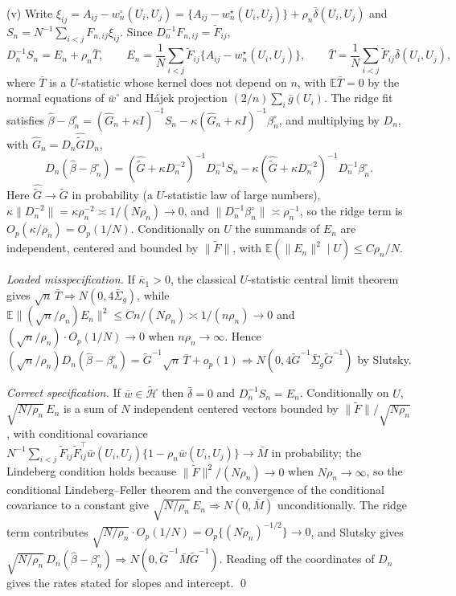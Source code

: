 \documentclass[12pt]{article}
\newcommand{\E}{\mathbb{E}}
\newcommand{\calH}{\mathcal{H}}
\newcommand{\norm}[1]{\|#1\|}
\newcommand{\wstar}{w^{\star}}
\newcommand{\bhat}{\hat\beta}
\begin{document}
(v) Write $\xi_{ij}=A_{ij}-w^{\circ}_n(U_i,U_j)=\{A_{ij}-\wstar_n(U_i,U_j)\}+\rho_n\bar\delta(U_i,U_j)$ and $S_n=N^{-1}\sum_{i<j}F_{n,ij}\xi_{ij}$. Since $D_n^{-1}F_{n,ij}=\tilde F_{ij}$,
\[
D_n^{-1}S_n=E_n+\rho_n\bar T,\qquad E_n=\frac1N\sum_{i<j}\tilde F_{ij}\{A_{ij}-\wstar_n(U_i,U_j)\},\qquad \bar T=\frac1N\sum_{i<j}\tilde F_{ij}\bar\delta(U_i,U_j),
\]
where $\bar T$ is a $U$-statistic whose kernel does not depend on $n$, with $\E\bar T=0$ by the normal equations of $\bar w^{\circ}$ and Hájek projection $(2/n)\sum_i\bar g(U_i)$. The ridge fit satisfies $\bhat-\beta^{\circ}_n=(\hat G_n+\kappa I)^{-1}S_n-\kappa(\hat G_n+\kappa I)^{-1}\beta^{\circ}_n$, and multiplying by $D_n$, with $\hat G_n=D_n\hat{\tilde G}D_n$,
\[
D_n(\bhat-\beta^{\circ}_n)=(\hat{\tilde G}+\kappa D_n^{-2})^{-1}D_n^{-1}S_n-\kappa(\hat{\tilde G}+\kappa D_n^{-2})^{-1}D_n^{-1}\beta^{\circ}_n .
\]
Here $\hat{\tilde G}\to\tilde G$ in probability (a $U$-statistic law of large numbers), $\kappa\norm{D_n^{-2}}=\kappa\rho_n^{-2}\asymp1/(N\rho_n)\to0$, and $\norm{D_n^{-1}\beta^{\circ}_n}\asymp\rho_n^{-1}$, so the ridge term is $O_p(\kappa/\rho_n)=O_p(1/N)$. Conditionally on $U$ the summands of $E_n$ are independent, centered and bounded by $\norm{\tilde F}$, with $\E(\norm{E_n}^2\mid U)\le C\rho_n/N$.

\emph{Loaded misspecification.} If $\bar\kappa_1>0$, the classical $U$-statistic central limit theorem gives $\sqrt n\,\bar T\Rightarrow N(0,4\bar\Sigma_g)$, while $\E\norm{(\sqrt n/\rho_n)E_n}^2\le Cn/(N\rho_n)\asymp1/(n\rho_n)\to0$ and $(\sqrt n/\rho_n)\cdot O_p(1/N)\to0$ when $n\rho_n\to\infty$. Hence $(\sqrt n/\rho_n)D_n(\bhat-\beta^{\circ}_n)=\tilde G^{-1}\sqrt n\,\bar T+o_p(1)\Rightarrow N(0,4\tilde G^{-1}\bar\Sigma_g\tilde G^{-1})$ by Slutsky.

\emph{Correct specification.} If $\bar w\in\tilde{\calH}$ then $\bar\delta=0$ and $D_n^{-1}S_n=E_n$. Conditionally on $U$, $\sqrt{N/\rho_n}\,E_n$ is a sum of $N$ independent centered vectors bounded by $\norm{\tilde F}/\sqrt{N\rho_n}$, with conditional covariance $N^{-1}\sum_{i<j}\tilde F_{ij}\tilde F_{ij}^{\top}\bar w(U_i,U_j)\{1-\rho_n\bar w(U_i,U_j)\}\to\bar M$ in probability; the Lindeberg condition holds because $\norm{\tilde F}^2/(N\rho_n)\to0$ when $N\rho_n\to\infty$, so the conditional Lindeberg--Feller theorem and the convergence of the conditional covariance to a constant give $\sqrt{N/\rho_n}\,E_n\Rightarrow N(0,\bar M)$ unconditionally. The ridge term contributes $\sqrt{N/\rho_n}\cdot O_p(1/N)=O_p\{(N\rho_n)^{-1/2}\}\to0$, and Slutsky gives $\sqrt{N/\rho_n}\,D_n(\bhat-\beta^{\circ}_n)\Rightarrow N(0,\tilde G^{-1}\bar M\tilde G^{-1})$. Reading off the coordinates of $D_n$ gives the rates stated for slopes and intercept. \qed
\end{document}
